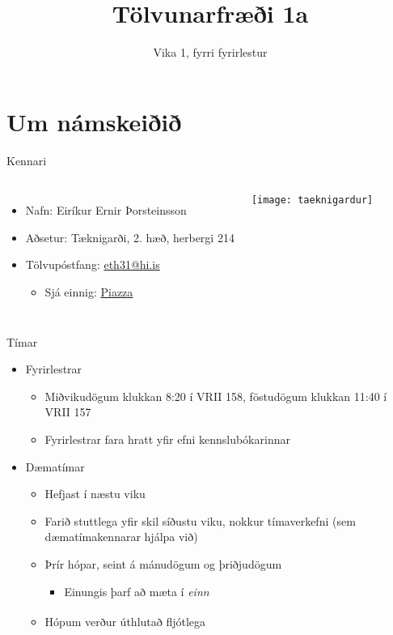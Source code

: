\documentclass{beamer}
\title{Tölvunarfræði 1a}
\subtitle{Vika 1, fyrri fyrirlestur}
\begin{document}
\begin{frame}
\titlepage
\end{frame}

\section{Um námskeiðið}

\begin{frame}{Kennari}
\begin{columns}
\begin{itemize}
 \item Nafn: Eiríkur Ernir Þorsteinsson
 \item Aðsetur: Tæknigarði, 2. hæð, herbergi 214
 \item Tölvupóstfang: \href{mailto:eth31@hi.is}{eth31@hi.is}
 \begin{itemize}
  \item Sjá einnig: \hyperlink{frame:piazza}{Piazza}
 \end{itemize}
\end{itemize}
\texttt{[image: taeknigardur]}
\end{columns}
\end{frame}

\begin{frame}{Tímar}
\begin{itemize}
 \item Fyrirlestrar
 \begin{itemize}
  \item Miðvikudögum klukkan 8:20 í VRII 158, föstudögum klukkan 11:40 í VRII 157
  \item Fyrirlestrar fara hratt yfir efni kennslubókarinnar
 \end{itemize}
 \item Dæmatímar
 \begin{itemize}
  \item Hefjast í næstu viku
  \item Farið stuttlega yfir skil síðustu viku, nokkur tímaverkefni (sem dæmatímakennarar hjálpa við)
  \item Þrír hópar, seint á mánudögum og þriðjudögum
  \begin{itemize}
   \item Einungis þarf að mæta í \emph{einn}
  \end{itemize}
  \item Hópum verður úthlutað fljótlega\textsuperscript{\textregistered}
 \end{itemize}
\end{itemize} 
\end{frame}
\end{document}
